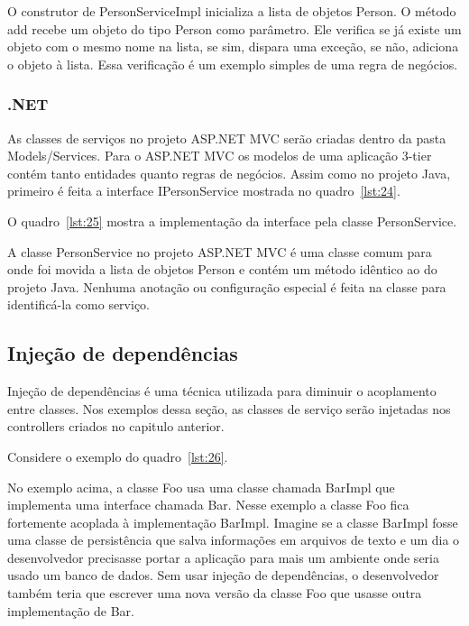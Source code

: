 \documentclass[a4paper,12pt]{article}
\newcommand{\javacode}[3] {
	
}
\newcommand{\sharpcode}[3] {
	
}
\begin{document}
O construtor de PersonServiceImpl inicializa a lista de objetos Person. O método add recebe um objeto do tipo Person como parâmetro. Ele verifica se já existe um objeto com o mesmo nome na lista, se sim, dispara uma exceção, se não, adiciona o objeto à lista. Essa verificação é um exemplo simples de uma regra de negócios.

\subsubsection{.NET}

As classes de serviços no projeto ASP.NET MVC serão criadas dentro da pasta Models/Services. Para o ASP.NET MVC os modelos de uma aplicação 3-tier contém tanto entidades quanto regras de negócios. Assim como no projeto Java, primeiro é feita a interface IPersonService mostrada no quadro~\ref{lst:24}.

\sharpcode{code/24.txt}{Interface IPersonService}{lst:24}

O quadro~\ref{lst:25} mostra a implementação da interface pela classe PersonService.

\sharpcode{code/25.txt}{Classe PersonService}{lst:25}

A classe PersonService no projeto ASP.NET MVC é uma classe comum para onde foi movida a lista de objetos Person e contém um método idêntico ao do projeto Java. Nenhuma anotação ou configuração especial é feita na classe para identificá-la como serviço.

\subsection{Injeção de dependências}

Injeção de dependências é uma técnica utilizada para diminuir o acoplamento entre classes. Nos exemplos dessa seção, as classes de serviço serão injetadas nos controllers criados no capitulo anterior. 

Considere o exemplo do quadro~\ref{lst:26}.

\javacode{code/26.txt}{Exemplo de classes fortemente acopladas}{lst:26}

No exemplo acima, a classe Foo usa uma classe chamada BarImpl que implementa uma interface chamada Bar. Nesse exemplo a classe Foo fica fortemente acoplada à implementação BarImpl. Imagine se a classe BarImpl fosse uma classe de persistência que salva informações em arquivos de texto e um dia o desenvolvedor precisasse portar a aplicação para mais um ambiente onde seria usado um banco de dados. Sem usar injeção de dependências, o desenvolvedor também teria que escrever uma nova versão da classe Foo que usasse outra implementação de Bar.
\end{document}
